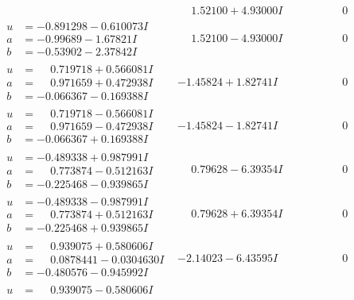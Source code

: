 \documentclass[1p]{elsarticle_modified}
\theoremstyle{definition}
\begin{document}
$$\begin{array}{c|c|c}
 & \phantom{-}1.52100 + 4.93000 I & \phantom{-0.000000 } 0 \\ \hline\begin{aligned}
u &= -0.891298 - 0.610073 I \\
a &= -0.99689 - 1.67821 I \\
b &= -0.53902 - 2.37842 I\end{aligned}
 & \phantom{-}1.52100 - 4.93000 I & \phantom{-0.000000 } 0 \\ \hline\begin{aligned}
u &= \phantom{-}0.719718 + 0.566081 I \\
a &= \phantom{-}0.971659 + 0.472938 I \\
b &= -0.066367 - 0.169388 I\end{aligned}
 & -1.45824 + 1.82741 I & \phantom{-0.000000 } 0 \\ \hline\begin{aligned}
u &= \phantom{-}0.719718 - 0.566081 I \\
a &= \phantom{-}0.971659 - 0.472938 I \\
b &= -0.066367 + 0.169388 I\end{aligned}
 & -1.45824 - 1.82741 I & \phantom{-0.000000 } 0 \\ \hline\begin{aligned}
u &= -0.489338 + 0.987991 I \\
a &= \phantom{-}0.773874 - 0.512163 I \\
b &= -0.225468 - 0.939865 I\end{aligned}
 & \phantom{-}0.79628 - 6.39354 I & \phantom{-0.000000 } 0 \\ \hline\begin{aligned}
u &= -0.489338 - 0.987991 I \\
a &= \phantom{-}0.773874 + 0.512163 I \\
b &= -0.225468 + 0.939865 I\end{aligned}
 & \phantom{-}0.79628 + 6.39354 I & \phantom{-0.000000 } 0 \\ \hline\begin{aligned}
u &= \phantom{-}0.939075 + 0.580606 I \\
a &= \phantom{-}0.0878441 - 0.0304630 I \\
b &= -0.480576 - 0.945992 I\end{aligned}
 & -2.14023 - 6.43595 I & \phantom{-0.000000 } 0 \\ \hline\begin{aligned}
u &= \phantom{-}0.939075 - 0.580606 I \\

\end{aligned}
\end{array}$$
\end{document}
